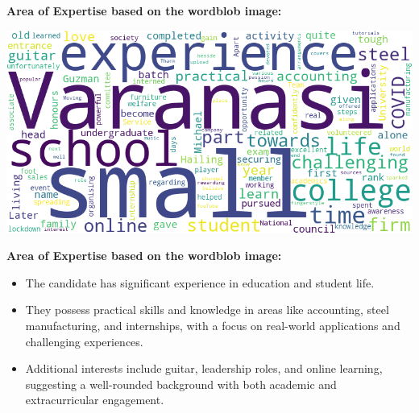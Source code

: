 \documentclass{article}
\begin{document}
\vspace{0.3in}
\LARGE \textbf{Area of Expertise based on the wordblob image:} \normalsize
\vspace{0.1in}
\begin{center}
    \includegraphics[width=1\columnwidth]{images/wordcloud_3.png}
\end{center}
\LARGE \textbf{Area of Expertise based on the wordblob image:} \normalsize
\begin{itemize}
    \item The candidate has significant experience in education and student life.
    \item They possess practical skills and knowledge in areas like accounting, steel manufacturing, and internships, with a focus on real-world applications and challenging experiences.
    \item Additional interests include guitar, leadership roles, and online learning, suggesting a well-rounded background with both academic and extracurricular engagement.
\end{itemize}
\end{document}
